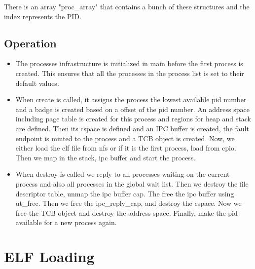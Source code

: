\documentclass[12pt]{article}
\begin{document}
There is an array "proc\_array" that contains a bunch of these structures and the index represents the PID.
\subsection{Operation}
\begin{itemize}
\item The processes infrastructure is initialized in main before the first process is created. This ensures that all the processes in the process list is set to their default values. 

\item When create is called, it assigns the process the lowest available pid number and a badge is created based on a offset of the pid number. An address space including page table is created for this process and regions for heap and stack are defined. Then its cspace is defined and an IPC buffer is created, the fault endpoint is minted to the process and a TCB object is created. Now, we either load the elf file from nfs or if it is the first process, load from cpio. Then we map in the stack, ipc buffer and start the process.

\item When destroy is called we reply to all processes waiting on the current process and also all processes in the global wait list. Then we destroy the file descriptor table, unmap the ipc buffer cap. The free the ipc buffer using ut\_free. Then we free the ipc\_reply\_cap, and destroy the cspace. Now we free the TCB object and destroy the address space. Finally, make the pid available for a new process again.
\end{itemize}
\clearpage
\section{ELF Loading}
\end{document}
